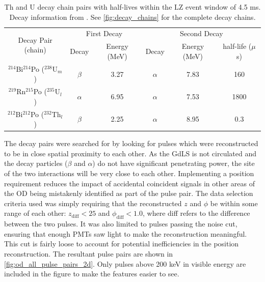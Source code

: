 \begin{table}[]
    \centering
    \begin{tabular}{c|c|c|c|c|c}
        \multirow{2}{*}{Decay Pair (chain)}                    & \multicolumn{2}{c|}{First Decay}   & \multicolumn{3}{c}{Second Decay}    \\ 
                                                               & Decay    & Energy (MeV) & Decay    & Energy (MeV) & half-life ($\mu$s) \\ \hline
        ${}^{214}$Bi${}^{214}$Po (${}^{238}$U$_{m}$)          & $\beta$  & 3.27         & $\alpha$ & 7.83         & 160   \\ 
        ${}^{219}$Rn${}^{215}$Po (${}^{235}$U$_{l}$)          & $\alpha$ & 6.95         & $\alpha$ & 7.53         & 1800  \\ 
        ${}^{212}$Bi${}^{212}$Po (${}^{232}$Th$_{l}$)         & $\beta$  & 2.25         & $\alpha$ & 8.95         & 0.3
    \end{tabular}
    \caption{Th and U decay chain pairs with half-lives within the LZ event window of 4.5 ms. 
             Decay information from \cite{radon_chains_ref}.
             See \autoref{fig:decay_chains} for the complete decay chains.}
    \label{tab:od_constrainable_decays_in_data}
\end{table}

\par
The decay pairs were searched for by looking for pulses which were reconstructed to be in close spatial proximity to each other.
As the GdLS is not circulated and the decay particles ($\beta$ and $\alpha$) do not have significant penetrating power, the site of the two interactions will be very close to each other.
Implementing a position requirement reduces the impact of accidental coincident signals in other areas of the OD being mistakenly identified as part of the pulse pair.
The data selection criteria used was simply requiring that the reconstructed $z$ and $\phi$ be within some range of each other: $z_{\text{diff}} < 25$ and $\phi_{\text{diff}} < 1.0$, where diff refers to the difference between the two pulses.
It was also limited to pulses passing the noise cut, ensuring that enough PMTs saw light to make the reconstruction meaningful.
This cut is fairly loose to account for potential inefficiencies in the position reconstruction.
The resultant pulse pairs are shown in \autoref{fig:od_all_pulse_pairs_2d}.
Only pulses above 200 keV in visible energy are included in the figure to make the features easier to see.

